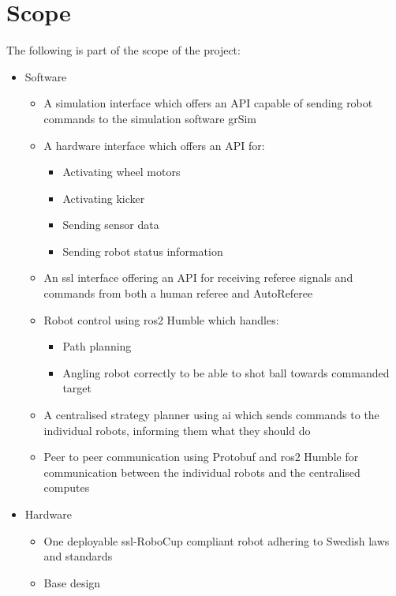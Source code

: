 \section{Scope}
\label{section:scope}

The following is part of the scope of the project:
\begin{itemize}
    \item Software
    \begin{itemize}
        \item A simulation interface which offers an API capable of sending robot commands to the simulation software grSim
        \item A hardware interface which offers an API for:
        \begin{itemize}
            \item Activating wheel motors
            \item Activating kicker
            \item Sending sensor data
            \item Sending robot status information
        \end{itemize}
        \item An \ac{ssl} interface offering an API for receiving referee signals and commands from both a human referee and AutoReferee
        \item Robot control using \ac{ros2} Humble which handles:
        \begin{itemize}
            \item Path planning
            \item Angling robot correctly to be able to shot ball towards commanded target
        \end{itemize}
        \item A centralised strategy planner using \ac{ai} which sends commands to the individual robots, informing them what they should do
        \item Peer to peer communication using Protobuf and \ac{ros2} Humble for communication between the individual robots and the centralised computes
    \end{itemize}
    \item Hardware
    \begin{itemize}
        \item One deployable \ac{ssl}-RoboCup compliant robot adhering to Swedish laws and standards
        \item Base design

\end{itemize}
\end{itemize}
